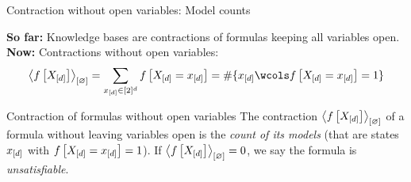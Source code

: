 \documentclass{beamer}
\begin{document}
    \begin{frame}{Contraction without open variables: Model counts}
        \par
        {\bf So far:} Knowledge bases are contractions of formulas keeping all variables open.
        \medskip \\
        {\bf Now:} Contractions without open variables:
        \begin{align*}
            \contraction{\formulawith}
            = \sum_{\shortcatindices\in[2]^{\catorder}} \formulaat{\indexedshortcatvariables}
            = \#\{\shortcatindices \wcols \formulaat{\indexedshortcatvariables}=1\}
        \end{align*}

        \begin{block}{Contraction of formulas without open variables}
            The contraction $\left\langle f\left[X_{[d]}\right]\right\rangle_{\left[ \varnothing \right]}$ of a formula without leaving variables open is the \emph{count of its models} (that are states $x_{[d]}$ with $f\left[X_{[d]}=x_{[d]}\right]=1$).
            If $\left\langle f\left[X_{[d]}\right]\right\rangle_{\left[ \varnothing \right]}=0$, we say the formula is \emph{unsatisfiable}.
        \end{block}
    \end{frame}
\end{document}
